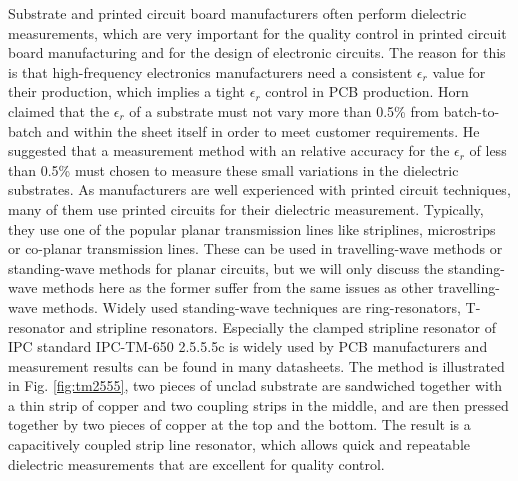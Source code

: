 Substrate and printed circuit board manufacturers often perform dielectric measurements, which are very important for the quality control in printed circuit board manufacturing and for the design of electronic circuits. The reason for this is that high-frequency electronics manufacturers need a consistent $\epsilon_r$ value for their production, which implies a tight $\epsilon_r$ control in PCB production. Horn \cite{horn} claimed that the $\epsilon_r$ of a substrate must not vary more than 0.5\% from batch-to-batch and within the sheet itself in order to meet customer requirements. He suggested that a measurement method with an relative accuracy for the $\epsilon_r$ of less than 0.5\% must chosen to measure these small variations in the dielectric substrates. As manufacturers are well experienced with printed circuit techniques, many of them use printed circuits for their dielectric measurement. Typically, they use one of the popular planar transmission lines like striplines, microstrips or co-planar transmission lines. These can be used in travelling-wave methods or standing-wave methods for planar circuits, but we will only discuss the standing-wave methods here as the former suffer from the same issues as other travelling-wave methods. Widely used standing-wave techniques are ring-resonators, T-resonator and strip\-line resonators. Especially the clamped stripline resonator of IPC standard IPC-TM-650 2.5.5.5c \cite{tm650} is widely used by PCB manufacturers and measurement results can be found in many datasheets. The method is illustrated in Fig. \ref{fig:tm2555}, two pieces of unclad substrate are sandwiched together with a thin strip of copper and two coupling strips in the middle, and are then pressed together by two pieces of copper at the top and the bottom. The result is a capacitively coupled strip line resonator, which allows quick and repeatable dielectric measurements that are excellent for quality control.

